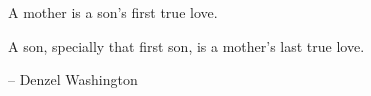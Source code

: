 

\begin{ntdedicatory}

A mother is a son's first true love.

A son, specially that first son, is a mother's last true love.

-- Denzel Washington

\end{ntdedicatory}